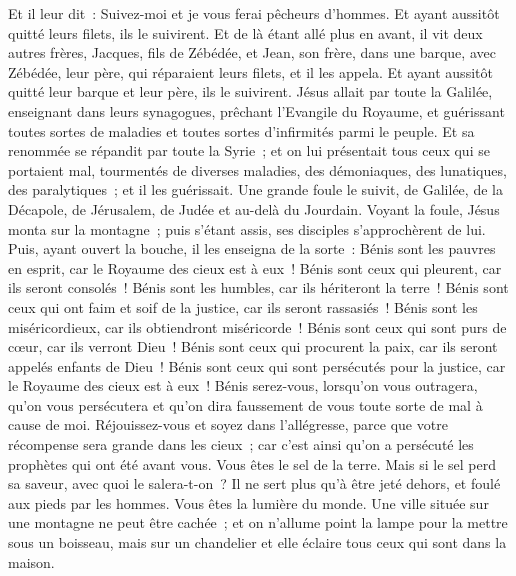 \begin{multicols}{2}
Et il leur dit~: Suivez-moi et je vous ferai pêcheurs d'hommes.
Et ayant aussitôt quitté leurs filets, ils le suivirent.
Et de là étant allé plus en avant, il vit deux autres frères, Jacques, fils de Zébédée, et Jean, son frère, dans une barque, avec Zébédée, leur père, qui réparaient leurs filets, et il les appela.
Et ayant aussitôt quitté leur barque et leur père, ils le suivirent.
Jésus allait par toute la Galilée, enseignant dans leurs synagogues, prêchant l'Evangile du Royaume, et guérissant toutes sortes de maladies et toutes sortes d'infirmités parmi le peuple.
Et sa renommée se répandit par toute la Syrie~; et on lui présentait tous ceux qui se portaient mal, tourmentés de diverses maladies, des démoniaques, des lunatiques, des paralytiques~; et il les guérissait.
Une grande foule le suivit, de Galilée, de la Décapole, de Jérusalem, de Judée et au-delà du Jourdain.
\VerseOne{}Voyant la foule, Jésus monta sur la montagne~; puis s'étant assis, ses disciples s'approchèrent de lui.
Puis, ayant ouvert la bouche, il les enseigna de la sorte~:
Bénis sont les pauvres en esprit, car le Royaume des cieux est à eux~!
Bénis sont ceux qui pleurent, car ils seront consolés~!
Bénis sont les humbles, car ils hériteront la terre~!
Bénis sont ceux qui ont faim et soif de la justice, car ils seront rassasiés~!
Bénis sont les miséricordieux, car ils obtiendront miséricorde~!
Bénis sont ceux qui sont purs de cœur, car ils verront Dieu~!
Bénis sont ceux qui procurent la paix, car ils seront appelés enfants de Dieu~!
Bénis sont ceux qui sont persécutés pour la justice, car le Royaume des cieux est à eux~!
Bénis serez-vous, lorsqu'on vous outragera, qu'on vous persécutera et qu'on dira faussement de vous toute sorte de mal à cause de moi.
Réjouissez-vous et soyez dans l'allégresse, parce que votre récompense sera grande dans les cieux~; car c'est ainsi qu'on a persécuté les prophètes qui ont été avant vous.
Vous êtes le sel de la terre. Mais si le sel perd sa saveur, avec quoi le salera-t-on~? Il ne sert plus qu'à être jeté dehors, et foulé aux pieds par les hommes.
Vous êtes la lumière du monde. Une ville située sur une montagne ne peut être cachée~;
et on n'allume point la lampe pour la mettre sous un boisseau, mais sur un chandelier et elle éclaire tous ceux qui sont dans la maison.

\end{multicols}
